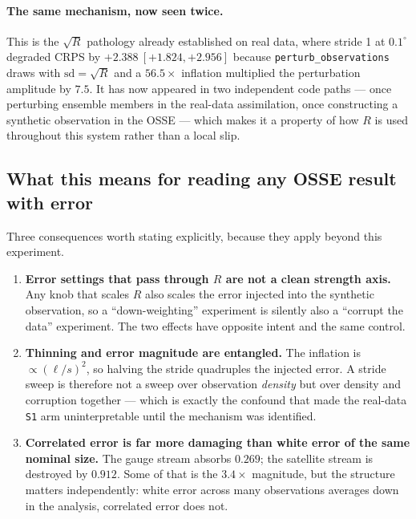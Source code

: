 \paragraph{The same mechanism, now seen twice.}
This is the $\sqrt{R}$ pathology already established on real data, where stride
1 at $0.1^\circ$ degraded CRPS by $+2.388~[+1.824, +2.956]$ because
\texttt{perturb\_observations} draws with $\mathrm{sd} = \sqrt{R}$ and a
$56.5\times$ inflation multiplied the perturbation amplitude by $7.5$. It has
now appeared in two independent code paths --- once perturbing ensemble members
in the real-data assimilation, once constructing a synthetic observation in the
OSSE --- which makes it a property of how $R$ is used throughout this system
rather than a local slip.

\subsection{What this means for reading any OSSE result with error}

Three consequences worth stating explicitly, because they apply beyond this
experiment.

\begin{enumerate}
  \item \textbf{Error settings that pass through $R$ are not a clean strength
    axis.} Any knob that scales $R$ also scales the error injected into the
    synthetic observation, so a ``down-weighting'' experiment is silently also
    a ``corrupt the data'' experiment. The two effects have opposite intent and
    the same control.
  \item \textbf{Thinning and error magnitude are entangled.} The inflation is
    $\propto (\ell/s)^2$, so halving the stride quadruples the injected error.
    A stride sweep is therefore not a sweep over observation \emph{density} but
    over density and corruption together --- which is exactly the confound that
    made the real-data \texttt{S1} arm uninterpretable until the mechanism was
    identified.
  \item \textbf{Correlated error is far more damaging than white error of the
    same nominal size.} The gauge stream absorbs $0.269$; the satellite stream
    is destroyed by $0.912$. Some of that is the $3.4\times$ magnitude, but the
    structure matters independently: white error across many observations
    averages down in the analysis, correlated error does not.
\end{enumerate}

